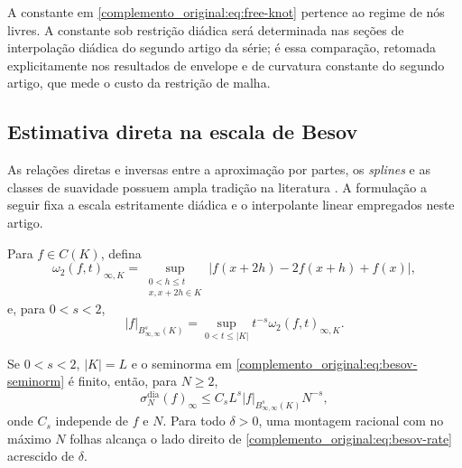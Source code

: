 A constante em \eqref{complemento_original:eq:free-knot} pertence ao regime de nós livres. A
constante sob restrição diádica será determinada nas seções de interpolação diádica do segundo artigo da série; é essa comparação, retomada explicitamente nos resultados de envelope e de curvatura constante do segundo artigo, que mede o
custo da restrição de malha.

\subsection{Estimativa direta na escala de Besov}

As relações diretas e inversas entre a aproximação por partes, os \emph{splines} e as classes
de suavidade possuem ampla tradição na literatura
\citep{artigo_2-birman1967,artigo_2-petrushev1988,artigo_2-devorepopov1988}. A formulação a seguir fixa a
escala estritamente diádica e o interpolante linear empregados neste artigo.

Para $f\in C(K)$, defina
\begin{equation}
 \omega_2(f,t)_{\infty,K}
 =\sup_{\substack{0<h\le t\\x,x+2h\in K}}
 |f(x+2h)-2f(x+h)+f(x)|,
\end{equation}
e, para $0<s<2$,
\begin{equation}
 |f|_{B^s_{\infty,\infty}(K)}
 =\sup_{0<t\le|K|}t^{-s}\omega_2(f,t)_{\infty,K}.
 \label{complemento_original:eq:besov-seminorm}
\end{equation}

\begin{theorem}\label{map:complemento_original:6.3}\label{complemento_original:thm:besov}
Se $0<s<2$, $|K|=L$ e o seminorma em \eqref{complemento_original:eq:besov-seminorm} é finito, então, para $N\ge2$,
\begin{equation}
 \sigma_N^{\mathrm{dia}}(f)_\infty
 \le C_sL^s|f|_{B^s_{\infty,\infty}(K)}N^{-s},
 \label{complemento_original:eq:besov-rate}
\end{equation}
onde $C_s$ independe de $f$ e $N$. Para todo $\delta>0$, uma montagem racional com no máximo $N$ folhas alcança o lado direito de \eqref{complemento_original:eq:besov-rate} acrescido de $\delta$.
\end{theorem}

